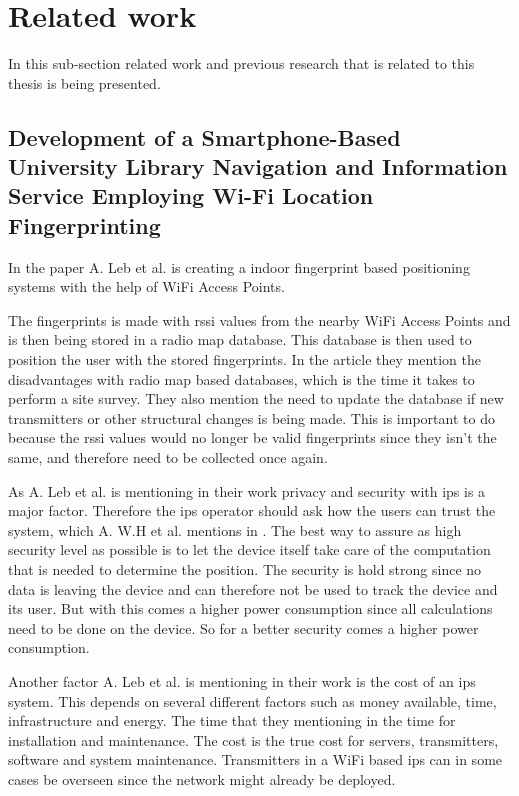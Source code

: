 \section{Related work}\label{sec:theoryRelatedWork}
In this sub-section related work and previous research that is related to this thesis is being presented.

\subsection{Development of a Smartphone-Based University Library Navigation and Information Service Employing Wi-Fi Location Fingerprinting}\label{sec:}
In the paper \cite{DevelopmentSmartphoneBasedUniversity2021} A. Leb et al. is creating a indoor fingerprint based positioning systems with the help of WiFi Access Points.

\bigskip

The fingerprints is made with \acrshort{rssi} values from the nearby WiFi Access Points and is then being stored in a radio map database.
This database is then used to position the user with the stored fingerprints.
In the article they mention the disadvantages with radio map based databases, which is the time it takes to perform a site survey.
They also mention the need to update the database if new transmitters or other structural changes is being made.
This is important to do because the \acrshort{rssi} values would no longer be valid fingerprints since they isn't the same, and therefore need to be collected once again.

\bigskip

As A. Leb et al. is mentioning in their work privacy and security with \acrfull{ips} is a major factor.
Therefore the \acrshort{ips} operator should ask how the users can trust the system, which A. W.H et al. mentions in \cite{SurveyWirelessIndoor2019}.
The best way to assure as high security level as possible is to let the device itself take care of the computation that is needed to determine the position.
The security is hold strong since no data is leaving the device and can therefore not be used to track the device and its user.
But with this comes a higher power consumption since all calculations need to be done on the device.
So for a better security comes a higher power consumption.

\bigskip

Another factor A. Leb et al. is mentioning in their work is the cost of an \acrshort{ips} system.
This depends on several different factors such as money available, time, infrastructure and energy.
The time that they mentioning in the time for installation and maintenance.
The cost is the true cost for servers, transmitters, software and system maintenance.
Transmitters in a WiFi based \acrshort{ips} can in some cases be overseen since the network might already be deployed.



